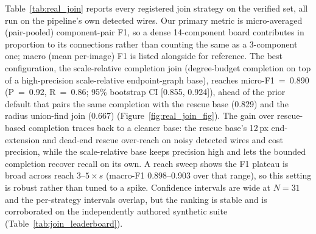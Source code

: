 \documentclass[journal]{IEEEtran}
\begin{document}
Table~\ref{tab:real_join} reports every registered join strategy on the verified set, all run on the pipeline's own detected wires. Our primary metric is micro-averaged (pair-pooled) component-pair F1, so a dense 14-component board contributes in proportion to its connections rather than counting the same as a 3-component one; macro (mean per-image) F1 is listed alongside for reference. The best configuration, the scale-relative completion join (degree-budget completion on top of a high-precision scale-relative endpoint-graph base), reaches micro-F1~=~0.890 (P~=~0.92, R~=~0.86; 95\% bootstrap CI [0.855, 0.924]), ahead of the prior default that pairs the same completion with the rescue base (0.829) and the radius union-find join (0.667) (Figure~\ref{fig:real_join_fig}). The gain over rescue-based completion traces back to a cleaner base: the rescue base's 12\,px end-extension and dead-end rescue over-reach on noisy detected wires and cost precision, while the scale-relative base keeps precision high and lets the bounded completion recover recall on its own. A reach sweep shows the F1 plateau is broad across reach $3$--$5\times s$ (macro-F1 0.898--0.903 over that range), so this setting is robust rather than tuned to a spike. Confidence intervals are wide at $N=31$ and the per-strategy intervals overlap, but the ranking is stable and is corroborated on the independently authored synthetic suite (Table~\ref{tab:join_leaderboard}).
\end{document}

